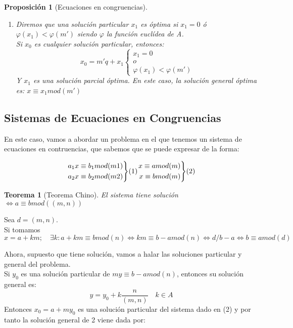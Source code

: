 \documentclass[11pt, a4paper, titlepage]{article}
\makeatletter
\renewenvironment{proof}[1][\proofname] {\vspace{-15pt}\par\pushQED{\qed}\normalfont\topsep6\p@\@plus6\p@\relax\trivlist\item[\hskip\labelsep\it#1\@addpunct{.}]\ignorespaces}{\popQED\endtrivlist\@endpefalse}
\theoremstyle{theorem-style}
\newtheorem*{nth}{Teorema}
\newtheorem*{nprop}{Proposición}
\theoremstyle{definition-style}
\theoremstyle{remark-style}
\theoremstyle{example-style}
\newenvironment{rcases}
  {\left.\begin{aligned}}
  {\end{aligned}\right\rbrace}
\makeatother
\begin{document}
\begin{nprop}[Ecuaciones en congruencias]
\begin{itemize}
\begin{enumerate}
\item Diremos que una solución particular $x_1$ es óptima si $x_1 = 0$ ó $\varphi(x_1) < \varphi(m')$ siendo $\varphi$ la función euclídea de A.\\
Si $x_0$ es cualquier solución particular, entonces:
\[
x_0 = m'q + x_1 \begin{cases}
	x_1 = 0\\
	o\\
	\varphi(x_1) < \varphi(m')
	
\end{cases}
\]
Y $x_1$ es una solución parcial óptima. En este caso, la solución general óptima es: $x\equiv x_1 mod(m')$
\end{enumerate}
\end{itemize}
	
\end{nprop}

\subsection{Sistemas de Ecuaciones en Congruencias}

En este caso, vamos a abordar un problema en el que tenemos un sistema de ecuaciones en contruencias, que sabemos que se puede expresar de la forma:

\[
\begin{rcases}
	a_1x \equiv b_1 mod(m1)\\
	a_2x \equiv b_2 mod(m2)
\end{rcases}(1) \begin{rcases}
	x \equiv a mod(m)\\
	x \equiv b mod(m)
\end{rcases}(2)
\]

\begin{nth}[Teorema Chino]
	El sistema tiene solución $\iff a \equiv b mod((m,n))$
\end{nth}
\begin{proof}
	Sea $d=(m,n)$. \\
	Si tomamos $x = a+km; \quad \exists k: a+km \equiv b mod(n) \iff km \equiv b-a mod(n) \iff d/b-a \iff b\equiv amod(d)$
\end{proof}

Ahora, supuesto que tiene solución, vamos a halar las soluciones particular y general del problema.\\
Si $y_0$ es una solución particular de $my \equiv b-a mod(n)$, entonces su solución general es: $$y = y_0 + k\frac{n}{(m,n)} \quad k \in A$$
Entonces $x_0 = a + my_0$ es una solución particular del sistema dado en (2) y por tanto la solución general de 2 viene dada por:
\end{document}
